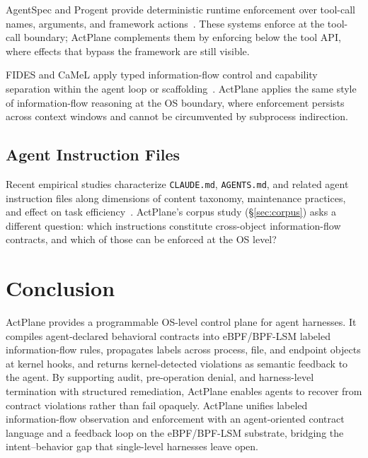 AgentSpec and Progent provide deterministic runtime enforcement over
tool-call names, arguments, and framework
actions~\cite{wang2025agentspec,shi2025progent}. These systems enforce at
the tool-call boundary; ActPlane complements them by enforcing below the
tool API, where effects that bypass the framework are still visible.

FIDES and CaMeL apply typed information-flow control and capability
separation within the agent loop or
scaffolding~\cite{costa2025fides,debenedetti2025camel}. ActPlane applies
the same style of information-flow reasoning at the OS boundary, where
enforcement persists across context windows and cannot be circumvented by
subprocess indirection.

\subsection{Agent Instruction Files}

Recent empirical studies characterize \texttt{CLAUDE.md},
\texttt{AGENTS.md}, and related agent instruction files along dimensions
of content taxonomy, maintenance practices, and effect on task
efficiency~\cite{chatlatanagulchai2025manifests,chatlatanagulchai2025agentreadmes,
santos2025claudeconfig,lulla2026agentsmd}. ActPlane's corpus study
(\S\ref{sec:corpus}) asks a different question: which instructions
constitute cross-object information-flow contracts, and which of those can
be enforced at the OS level?


\section{Conclusion}
\label{sec:conclusion}

ActPlane provides a programmable OS-level control plane for agent harnesses.
It compiles agent-declared behavioral contracts into eBPF/BPF-LSM labeled
information-flow rules, propagates labels across process, file, and endpoint
objects at kernel hooks, and returns kernel-detected violations as semantic
feedback to the agent. By supporting audit, pre-operation denial, and
harness-level termination with structured remediation, ActPlane enables
agents to recover from contract violations rather than fail opaquely.
ActPlane unifies labeled information-flow observation and enforcement with
an agent-oriented contract language and a feedback loop on the eBPF/BPF-LSM
substrate, bridging the intent--behavior gap that single-level harnesses
leave open.
